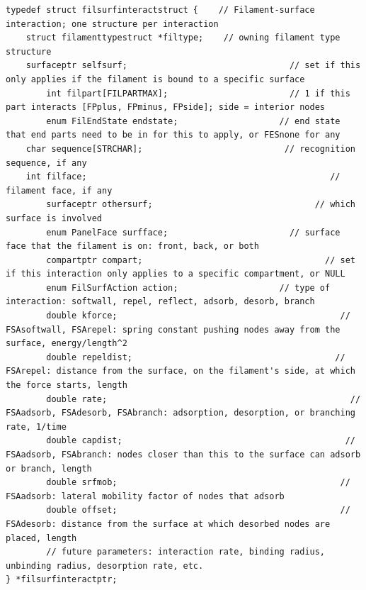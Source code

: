 \documentclass {scrbook}
\begin{document}
\begin{lstlisting}
typedef struct filsurfinteractstruct {    // Filament-surface interaction; one structure per interaction
    struct filamenttypestruct *filtype;    // owning filament type structure
    surfaceptr selfsurf;                                // set if this only applies if the filament is bound to a specific surface
        int filpart[FILPARTMAX];                        // 1 if this part interacts [FPplus, FPminus, FPside]; side = interior nodes
        enum FilEndState endstate;                    // end state that end parts need to be in for this to apply, or FESnone for any
    char sequence[STRCHAR];                            // recognition sequence, if any
    int filface;                                                // filament face, if any
        surfaceptr othersurf;                                // which surface is involved
        enum PanelFace surfface;                        // surface face that the filament is on: front, back, or both
        compartptr compart;                                    // set if this interaction only applies to a specific compartment, or NULL
        enum FilSurfAction action;                    // type of interaction: softwall, repel, reflect, adsorb, desorb, branch
        double kforce;                                            // FSAsoftwall, FSArepel: spring constant pushing nodes away from the surface, energy/length^2
        double repeldist;                                        // FSArepel: distance from the surface, on the filament's side, at which the force starts, length
        double rate;                                                // FSAadsorb, FSAdesorb, FSAbranch: adsorption, desorption, or branching rate, 1/time
        double capdist;                                            // FSAadsorb, FSAbranch: nodes closer than this to the surface can adsorb or branch, length
        double srfmob;                                            // FSAadsorb: lateral mobility factor of nodes that adsorb
        double offset;                                            // FSAdesorb: distance from the surface at which desorbed nodes are placed, length
        // future parameters: interaction rate, binding radius, unbinding radius, desorption rate, etc.
} *filsurfinteractptr;
\end{lstlisting}
\end{document}
